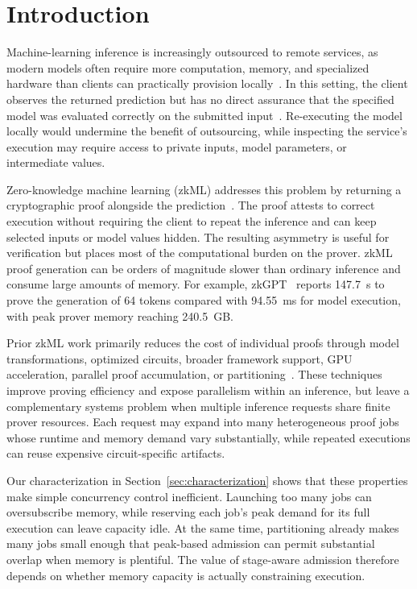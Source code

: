 \section{Introduction}
\label{sec:intro}

Machine-learning inference is increasingly outsourced to remote services, as modern models often require more computation, memory, and specialized hardware than clients can practically provision locally~\cite{zhang2024hardware,sheng2023flexgen}. In this setting, the client observes the returned prediction but has no direct assurance that the specified model was evaluated correctly on the submitted input~\cite{kang2024scaling,qu2025zkgpt}. Re-executing the model locally would undermine the benefit of outsourcing, while inspecting the service's execution may require access to private inputs, model parameters, or intermediate values.

Zero-knowledge machine learning (zkML) addresses this problem by returning a cryptographic proof alongside the prediction~\cite{chen2024zkml,kang2024scaling,boyuan2021zen,chen2025zktorch}. The proof attests to correct execution without requiring the client to repeat the inference and can keep selected inputs or model values hidden. The resulting asymmetry is useful for verification but places most of the computational burden on the prover. zkML proof generation can be orders of magnitude slower than ordinary inference and consume large amounts of memory. For example, zkGPT~\cite{qu2025zkgpt} reports 147.7~s to prove the generation of 64 tokens compared with 94.55~ms for model execution, with peak prover memory reaching 240.5~GB.

Prior zkML work primarily reduces the cost of individual proofs through model transformations, optimized circuits, broader framework support, GPU acceleration, parallel proof accumulation, or partitioning~\cite{boyuan2021zen,chen2024zkml,ezkl,sin2024zkllm,chen2025zktorch,ivanov2025dsperse}. These techniques improve proving efficiency and expose parallelism within an inference, but leave a complementary systems problem when multiple inference requests share finite prover resources. Each request may expand into many heterogeneous proof jobs whose runtime and memory demand vary substantially, while repeated executions can reuse expensive circuit-specific artifacts.

Our characterization in Section~\ref{sec:characterization} shows that these properties make simple concurrency control inefficient. Launching too many jobs can oversubscribe memory, while reserving each job's peak demand for its full execution can leave capacity idle. At the same time, partitioning already makes many jobs small enough that peak-based admission can permit substantial overlap when memory is plentiful. The value of stage-aware admission therefore depends on whether memory capacity is actually constraining execution.

